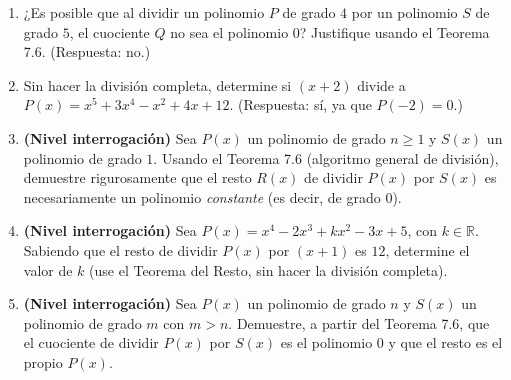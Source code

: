 \documentclass[11pt]{article}
\begin{document}
\begin{enumerate}[label=\arabic*.]
\item ¿Es posible que al dividir un polinomio $P$ de grado $4$ por un
polinomio $S$ de grado $5$, el cuociente $Q$ no sea el polinomio $0$?
Justifique usando el Teorema 7.6. (Respuesta: no.)

\item Sin hacer la división completa, determine si $(x+2)$ divide a
$P(x) = x^5 + 3x^4 - x^2 + 4x + 12$. (Respuesta: sí, ya que $P(-2)=0$.)

\item \textbf{(Nivel interrogación)} Sea $P(x)$ un polinomio de grado $n\ge1$ y $S(x)$ un
polinomio de grado $1$. Usando el Teorema 7.6 (algoritmo general de división), demuestre
rigurosamente que el resto $R(x)$ de dividir $P(x)$ por $S(x)$ es necesariamente un polinomio
\emph{constante} (es decir, de grado $0$).

\item \textbf{(Nivel interrogación)} Sea $P(x) = x^4 - 2x^3 + kx^2 - 3x + 5$, con $k\in\mathbb{R}$.
Sabiendo que el resto de dividir $P(x)$ por $(x+1)$ es $12$, determine el valor de $k$ (use el
Teorema del Resto, sin hacer la división completa).

\item \textbf{(Nivel interrogación)} Sea $P(x)$ un polinomio de grado $n$ y $S(x)$ un polinomio de
grado $m$ con $m>n$. Demuestre, a partir del Teorema 7.6, que el cuociente de dividir $P(x)$ por
$S(x)$ es el polinomio $0$ y que el resto es el propio $P(x)$.

\end{enumerate}
\end{document}
